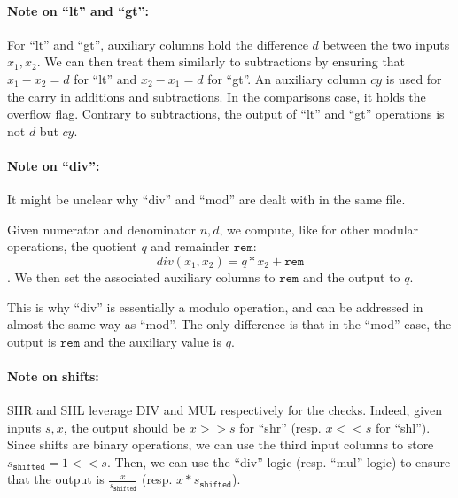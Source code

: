 \paragraph*{Note on ``lt'' and ``gt'':} For ``lt'' and ``gt'', auxiliary columns hold the difference $d$ between the two inputs $x_1, x_2$. We can then treat them similarly to subtractions by ensuring that $x_1 - x_2 = d$ for ``lt'' and $x_2 - x_1 = d$ for ``gt''. An auxiliary column $cy$ is used for the carry in additions and subtractions. In the comparisons case, it holds the overflow flag. Contrary to subtractions, the output of ``lt'' and ``gt'' operations is not $d$ but $cy$. 

\paragraph*{Note on ``div'':} It might be unclear why ``div'' and ``mod'' are dealt with in the same file. 

Given numerator and denominator $n, d$, we compute, like for other modular operations, the quotient $q$ and remainder $\texttt{rem}$: 
$$div(x_1, x_2) = q * x_2 + \texttt{rem}$$. 
We then set the associated auxiliary columns to $\texttt{rem}$ and the output to $q$. 

This is why ``div'' is essentially a modulo operation, and can be addressed in almost the same way as ``mod''. The only difference is that in the ``mod'' case, the output is $\texttt{rem}$ and the auxiliary value is $q$.

\paragraph{Note on shifts:} SHR and SHL leverage DIV and MUL respectively for the checks. Indeed, given inputs $s, x$, the output should be $x >> s$ for ``shr'' (resp. $x << s$ for ``shl''). Since shifts are binary operations, we can use the third input columns to store $s_{\texttt{shifted}} = 1 << s$. Then, we can use the ``div'' logic (resp. ``mul'' logic) to ensure that the output is $\frac{x}{s_{\texttt{shifted}}}$ (resp. $x * s_{\texttt{shifted}}$).